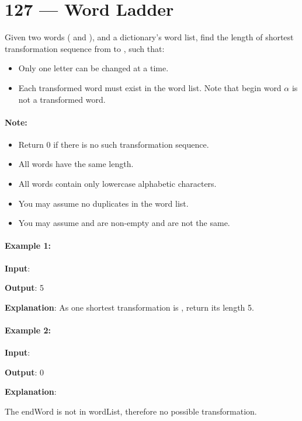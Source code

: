 \section{127 --- Word Ladder}
Given two words ( and ), and a dictionary's word list, find the length of shortest transformation sequence from  to , such that:
\begin{itemize}
\item Only one letter can be changed at a time.
\item Each transformed word must exist in the word list. Note that begin word $\alpha$ is not a transformed word.
\end{itemize}
\paragraph{Note:}
\begin{itemize}
\item Return 0 if there is no such transformation sequence.
\item All words have the same length.
\item All words contain only lowercase alphabetic characters.
\item You may assume no duplicates in the word list.
\item You may assume  and  are non-empty and are not the same.
\end{itemize}
\paragraph{Example 1:}
\begin{flushleft}
\textbf{Input}: 




\textbf{Output}: 5

\textbf{Explanation}: As one shortest transformation is , return its length 5.

\end{flushleft}

\paragraph{Example 2:}

\begin{flushleft}

\textbf{Input}: 




\textbf{Output}: 0

\textbf{Explanation}: 

The endWord  is not in wordList, therefore no possible transformation.

\end{flushleft}

